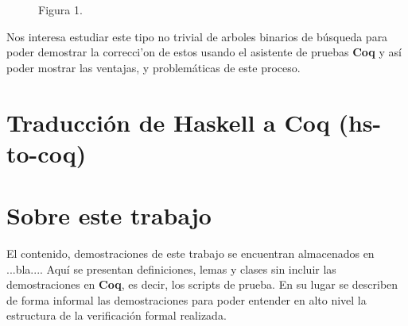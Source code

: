 \documentclass[letterpaper,12pt,oneside]{book}
\newcommand{\coq}{\textbf{Coq}}
\theoremstyle{plain}
\theoremstyle{definition}
\theoremstyle{remark}
\begin{document}
\begin{figure}
\label{arbolRB}
\centering Figura 1.
\end{figure}
Nos interesa estudiar este tipo no trivial de arboles binarios de búsqueda para poder demostrar la 
correcci'on de estos usando el asistente de pruebas {\coq} y así poder mostrar las ventajas, y 
problemáticas de este proceso.
\section{Traducción de Haskell a {\coq} (hs-to-coq)}

\section {Sobre este trabajo}
El contenido, demostraciones de este trabajo se encuentran almacenados en ...bla.... Aqu\'i se presentan 
definiciones, lemas y clases sin incluir las demostraciones en {\coq}, es decir, los scripts de prueba. 
En su lugar se describen de forma informal las demostraciones para poder entender en alto nivel la 
estructura de la verificaci\'on formal realizada.
\end{document}
